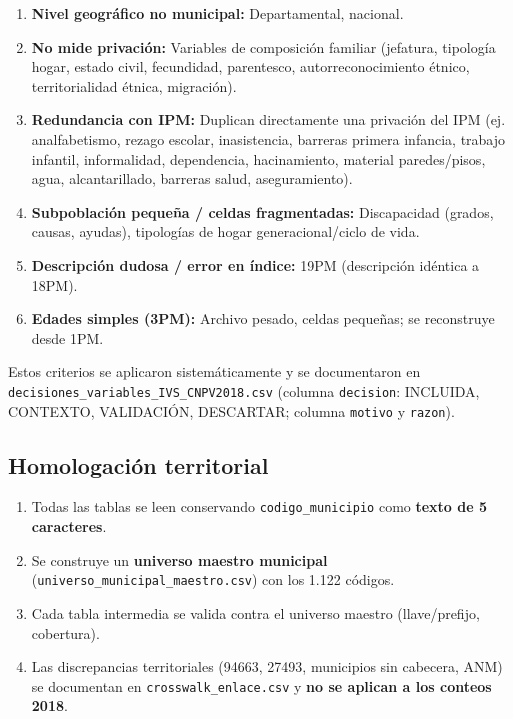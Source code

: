 \begin{enumerate}
    \item \textbf{Nivel geográfico no municipal:} Departamental, nacional.
    \item \textbf{No mide privación:} Variables de composición familiar (jefatura, tipología hogar, estado civil, fecundidad, parentesco, autorreconocimiento étnico, territorialidad étnica, migración).
    \item \textbf{Redundancia con IPM:} Duplican directamente una privación del IPM (ej. analfabetismo, rezago escolar, inasistencia, barreras primera infancia, trabajo infantil, informalidad, dependencia, hacinamiento, material paredes/pisos, agua, alcantarillado, barreras salud, aseguramiento).
    \item \textbf{Subpoblación pequeña / celdas fragmentadas:} Discapacidad (grados, causas, ayudas), tipologías de hogar generacional/ciclo de vida.
    \item \textbf{Descripción dudosa / error en índice:} 19PM (descripción idéntica a 18PM).
    \item \textbf{Edades simples (3PM):} Archivo pesado, celdas pequeñas; se reconstruye desde 1PM.
\end{enumerate}

Estos criterios se aplicaron sistemáticamente y se documentaron en \texttt{decisiones\_variables\_IVS\_CNPV2018.csv} (columna \texttt{decision}: INCLUIDA, CONTEXTO, VALIDACIÓN, DESCARTAR; columna \texttt{motivo} y \texttt{razon}).

\subsection{Homologación territorial}
\label{sec:homologacion}

\begin{enumerate}
    \item Todas las tablas se leen conservando \texttt{codigo\_municipio} como \textbf{texto de 5 caracteres}.
    \item Se construye un \textbf{universo maestro municipal} (\texttt{universo\_municipal\_maestro.csv}) con los 1.122 códigos.
    \item Cada tabla intermedia se valida contra el universo maestro (llave/prefijo, cobertura).
    \item Las discrepancias territoriales (94663, 27493, municipios sin cabecera, ANM) se documentan en \texttt{crosswalk\_enlace.csv} y \textbf{no se aplican a los conteos 2018}.
\end{enumerate}

